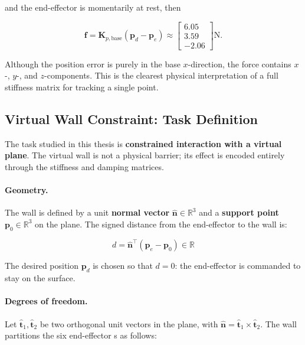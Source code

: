 and the end-effector is momentarily at rest, then

\begin{equation}
\label{eq:tracking_force_numeric}
\mathbf{f}
=
\mathbf{K}_{p,\mathrm{base}}
(\mathbf{p}_d-\mathbf{p}_e)
\approx
\begin{bmatrix}
6.05\\3.59\\-2.06
\end{bmatrix}
\mathrm{N}.
\end{equation}

Although the position error is purely in the base \(x\)-direction, the force
contains \(x\)-, \(y\)-, and \(z\)-components. This is the clearest physical
interpretation of a full stiffness matrix for tracking a single point.

\subsection{Virtual Wall Constraint: Task Definition}
\label{subsec:virtual_wall}

The task studied in this thesis is \textbf{constrained interaction
with a virtual plane}.
The virtual wall is not a physical barrier; its effect is encoded
entirely through the stiffness and damping matrices.

\paragraph{Geometry.}
The wall is defined by a unit \textbf{normal vector}
$\hat{\mathbf{n}}\in\mathbb{R}^3$ and a \textbf{support point}
$\mathbf{p}_0\in\mathbb{R}^3$ on the plane.
The signed distance from the end-effector to the wall is:

\begin{equation}
\label{eq:wall_dist}
d = \hat{\mathbf{n}}^\top(\mathbf{p}_e-\mathbf{p}_0)\in\mathbb{R}
\end{equation}

The desired position $\mathbf{p}_d$ is chosen so that $d=0$: the
end-effector is commanded to stay on the surface.

\paragraph{Degrees of freedom.}
Let $\hat{\mathbf{t}}_1,\hat{\mathbf{t}}_2$ be two orthogonal
unit vectors in the plane, with
$\hat{\mathbf{n}}=\hat{\mathbf{t}}_1\times\hat{\mathbf{t}}_2$.
The wall partitions the six end-effector s as follows:

